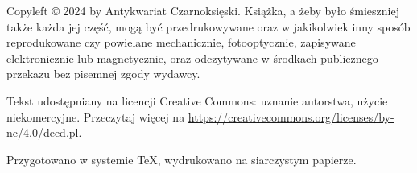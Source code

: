 {\noindent Copyleft © 2024 by Antykwariat Czarnoksięski.
Książka, a żeby było śmieszniej także każda jej część, mogą być przedrukowywane oraz w jakikolwiek inny sposób reprodukowane czy powielane mechanicznie, fotooptycznie, zapisywane elektronicznie lub magnetycznie, oraz odczytywane w środkach publicznego przekazu bez pisemnej zgody wydawcy.
}

\vspace{5mm}
{
    \noindent
    Tekst udostępniany na licencji Creative Commons: uznanie autorstwa, użycie niekomercyjne. Przeczytaj więcej na \url{https://creativecommons.org/licenses/by-nc/4.0/deed.pl}.
}

\vspace{5mm}

{\noindent Przygotowano w systemie \TeX, wydrukowano na siarczystym papierze.}


